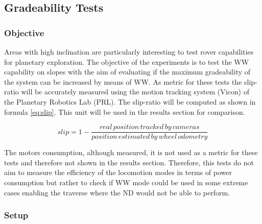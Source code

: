 \documentclass[a4paper,twocolumn]{esapub2005} %
\begin{document}

\subsection{Gradeability Tests}

\subsubsection{Objective}
Areas with high inclination are particularly interesting to test rover
capabilities for planetary exploration. The objective of the experiments is to
test the WW capability on slopes with the aim of evaluating if the maximum
gradeability of the system can be increased by means of WW. As metric for these
tests the slip-ratio will be accurately measured using the motion tracking
system (Vicon) of the Planetary Robotics Lab (PRL). The slip-ratio will be
computed as shown in formula \ref{eq:slip}. This unit will be used in the
results section for comparison.

\begin{equation} slip = 1- \frac{real\, position\, tracked\, by\,
cameras}{position\, estimated\, by\, wheel\, odometry} \label{eq:slip}
\end{equation}

The motors consumption, although measured, it is not used as a metric for these
tests and therefore not shown in the results section. Therefore, this tests do
not aim to measure the efficiency of the locomotion modes in terms of power
consumption but rather to check if WW mode could be used in some extreme cases
enabling the traverse where the ND would not be able to
perform\footnotemark[2].


\subsubsection{Setup}
\end{document}
